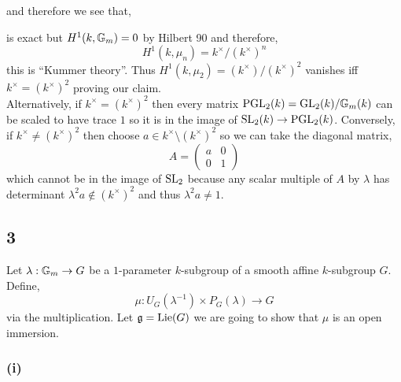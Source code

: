 \documentclass[12pt]{article}
\begin{document}
\begin{center}
\end{center}
and therefore we see that,
\begin{center}
\end{center}
is exact but $H^1(k, \mathbb{G}_m) = 0$ by Hilbert 90 and therefore,
\[ H^1(k, \mu_n) = k^\times / (k^\times)^n \]
this is ``Kummer theory''. Thus $H^1(k, \mu_2) = (k^\times)/(k^\times)^2$ vanishes iff $k^\times = (k^\times)^2$ proving our claim.
\bigskip\\
Alternatively, if $k^\times = (k^\times)^2$ then every matrix $\mathrm{PGL}_2(k) = \mathrm{GL}_2(k) / \mathbb{G}_m(k)$ can be scaled to have trace $1$ so it is in the image of $\mathrm{SL}_2(k) \to \mathrm{PGL}_2(k)$. Conversely, if $k^\times \neq (k^\times)^2$ then choose $a \in k^\times \setminus (k^\times)^2$ so we can take the diagonal matrix,
\[ 
A = \begin{pmatrix}
a & 0
\\
0 & 1
\end{pmatrix} \]
which cannot be in the image of $\mathrm{SL}_2$ because any scalar multiple of $A$ by $\lambda$ has determinant $\lambda^2 a \notin (k^\times)^2$ and thus $\lambda^2 a \neq 1$. 


\subsection{3}

Let $\lambda : \mathbb{G}_m \to G$ be a $1$-parameter $k$-subgroup of a smooth affine $k$-subgroup $G$. Define,
\[ \mu : U_G(\lambda^{-1}) \times P_G(\lambda) \to G \]
via the multiplication. Let $\mathfrak{g} = \mathrm{Lie}{(G)}$ we are going to show that $\mu$ is an open immersion.

\subsubsection{(i)}
\end{document}

